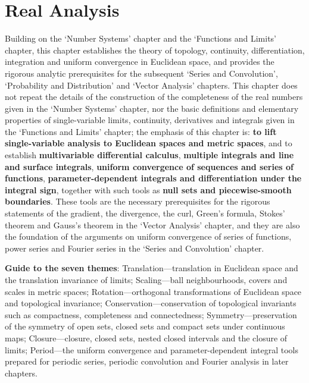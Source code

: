 \chapter{Real Analysis}
\label{chap:real_analysis}

\begin{remark}\label{rem:real_analysis_positioning}
Building on the `Number Systems' chapter and the `Functions and Limits' chapter, this chapter establishes the theory of topology, continuity, differentiation, integration and uniform convergence in Euclidean space, and provides the rigorous analytic prerequisites for the subsequent `Series and Convolution', `Probability and Distribution' and `Vector Analysis' chapters. This chapter does not repeat the details of the construction of the completeness of the real numbers given in the `Number Systems' chapter, nor the basic definitions and elementary properties of single-variable limits, continuity, derivatives and integrals given in the `Functions and Limits' chapter; the emphasis of this chapter is: \textbf{to lift single-variable analysis to Euclidean spaces and metric spaces}, and to establish \textbf{multivariable differential calculus}, \textbf{multiple integrals and line and surface integrals}, \textbf{uniform convergence of sequences and series of functions}, \textbf{parameter-dependent integrals and differentiation under the integral sign}, together with such tools as \textbf{null sets and piecewise-smooth boundaries}. These tools are the necessary prerequisites for the rigorous statements of the gradient, the divergence, the curl, Green's formula, Stokes' theorem and Gauss's theorem in the `Vector Analysis' chapter, and they are also the foundation of the arguments on uniform convergence of series of functions, power series and Fourier series in the `Series and Convolution' chapter.

\textbf{Guide to the seven themes}: Translation---translation in Euclidean space and the translation invariance of limits; Scaling---ball neighbourhoods, covers and scales in metric spaces; Rotation---orthogonal transformations of Euclidean space and topological invariance; Conservation---conservation of topological invariants such as compactness, completeness and connectedness; Symmetry---preservation of the symmetry of open sets, closed sets and compact sets under continuous maps; Closure---closure, closed sets, nested closed intervals and the closure of limits; Period---the uniform convergence and parameter-dependent integral tools prepared for periodic series, periodic convolution and Fourier analysis in later chapters.
\end{remark}

